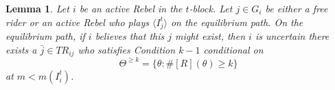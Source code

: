 \documentclass[12pt,letter]{article}
\newtheorem{lemma}{Lemma}[section]
\theoremstyle{definition}
\theoremstyle{definition}
\theoremstyle{remark}
\theoremstyle{claim}
\begin{document}
%
%
%
%

\begin{lemma} Let $i$ be an active Rebel in the $t$-block. Let $j\in G_i$ be either a free rider or an active Rebel who plays $\langle I^t_j \rangle$ on the equilibrium path. On the equilibrium path, if $i$ believes that this $j$ might exist, then $i$ is uncertain there exists a $\bar{j}\in TR_{ij}$ who satisfies Condition $k-1$ conditional on \[\Theta^{\geq k}=\{\theta:\#[R](\theta)\geq k\}\] at $m<m(I^t_i)$.  
\end{lemma}
\end{document}
